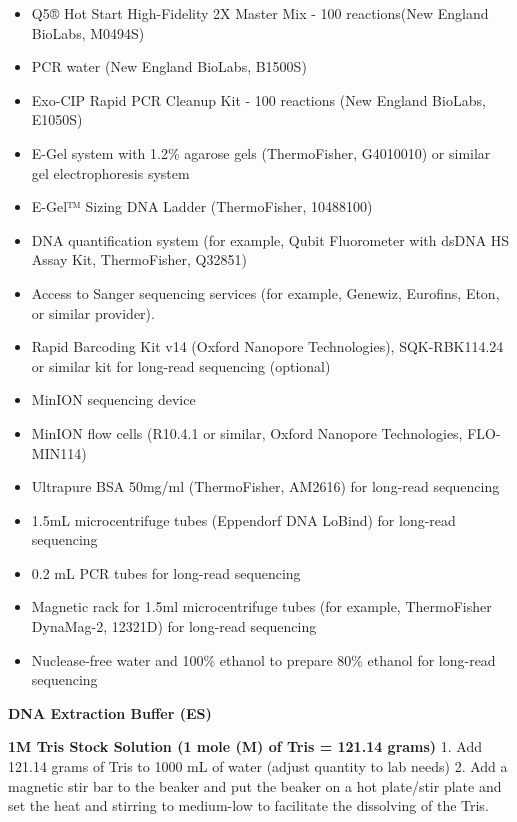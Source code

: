 \documentclass[
  letterpaper,
  DIV=11,
  numbers=noendperiod]{scrreprt}
\providecommand{\tightlist}{%
  \setlength{\itemsep}{0pt}\setlength{\parskip}{0pt}}
\begin{document}
\begin{itemize}
  \begin{itemize}
  \tightlist
  \item
    ITS1f: 5'-CTTGGTCATTTAGAGGAAGTAA-3'
  \item
    ITS4: 5'-TCCTCCGCTTATTGATATGC-3'
  \item
    5.8SR: 5'-CGCTGCGTTCTTCATCG-3'
  \item
    fITS7: 5'-GTGARTCATCGAATCTTTG-3'
  \end{itemize}
\item
  Q5® Hot Start High-Fidelity 2X Master Mix - 100 reactions(New England
  BioLabs, M0494S)
\item
  PCR water (New England BioLabs, B1500S)
\item
  Exo-CIP Rapid PCR Cleanup Kit - 100 reactions (New England BioLabs,
  E1050S)
\item
  E-Gel system with 1.2\% agarose gels (ThermoFisher, G4010010) or
  similar gel electrophoresis system
\item
  E-Gel™ Sizing DNA Ladder (ThermoFisher, 10488100)
\item
  DNA quantification system (for example, Qubit Fluorometer with dsDNA
  HS Assay Kit, ThermoFisher, Q32851)
\item
  Access to Sanger sequencing services (for example, Genewiz, Eurofins,
  Eton, or similar provider).
\item
  Rapid Barcoding Kit v14 (Oxford Nanopore Technologies), SQK-RBK114.24
  or similar kit for long-read sequencing (optional)
\item
  MinION sequencing device
\item
  MinION flow cells (R10.4.1 or similar, Oxford Nanopore Technologies,
  FLO-MIN114)
\item
  Ultrapure BSA 50mg/ml (ThermoFisher, AM2616) for long-read sequencing
\item
  1.5mL microcentrifuge tubes (Eppendorf DNA LoBind) for long-read
  sequencing
\item
  0.2 mL PCR tubes for long-read sequencing
\item
  Magnetic rack for 1.5ml microcentrifuge tubes (for example,
  ThermoFisher DynaMag-2, 12321D) for long-read sequencing
\item
  Nuclease-free water and 100\% ethanol to prepare 80\% ethanol for
  long-read sequencing
\end{itemize}

\textbf{DNA Extraction Buffer (ES)}

\textbf{1M Tris Stock Solution (1 mole (M) of Tris = 121.14 grams)} 1.
Add 121.14 grams of Tris to 1000 mL of water (adjust quantity to lab
needs) 2. Add a magnetic stir bar to the beaker and put the beaker on a
hot plate/stir plate and set the heat and stirring to medium-low to
facilitate the dissolving of the Tris.
\end{document}
